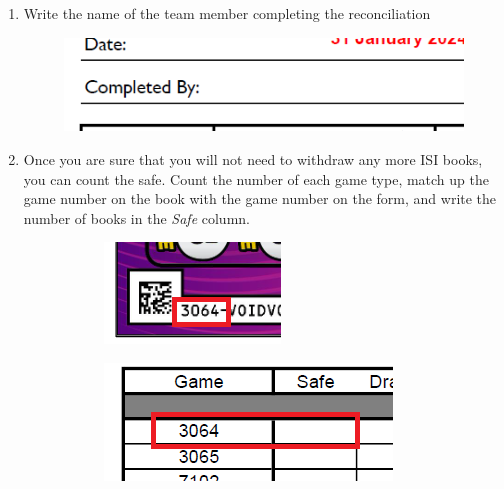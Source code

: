 \documentclass[a4paper, 12pt]{article}
\begin{document}
\begin{enumerate}
    \item Write the name of the team member completing the reconciliation
    \begin{figure}[h]
        \centering
        \includegraphics[width=0.5\linewidth]{images//reconsheet/completedby.png}
    \end{figure}
    \item Once you are sure that you will not need to withdraw any more ISI books, you can count the safe. Count the number of each game type, match up the game number on the book with the game number on the form, and write the number of books in the \textit{Safe} column.
    \begin{figure}[h]
    \centering
        \hfill
        \begin{subfigure}[b]{0.3\linewidth}
            \centering
            \includegraphics[width=\linewidth]{images/reconsheet/isiticket.png} 
        \end{subfigure}
        \hfill
        \begin{subfigure}[b]{0.45\linewidth}
            \centering
            \includegraphics[width=\linewidth]{images/reconsheet/safebook.png} 

\end{subfigure}
\end{figure}
\end{enumerate}
\end{document}
